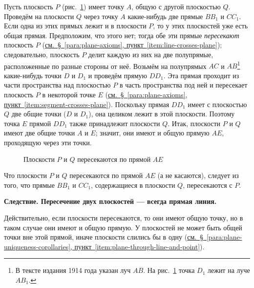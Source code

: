 Пусть плоскость \(P\) (рис.~\ref{fig:kiselev-stereo-303}) имеет точку \(A\), общую с другой плоскостью \(Q\). Проведём на плоскости \(Q\) через точку \(A\) какие-нибудь две прямые \(BB_1\) и \(CC_1\). Если одна из этих прямых лежит и в плоскости \(P\), то у этих плоскостей уже есть общая прямая. Предположим, что этого нет; тогда обе эти прямые \emph{пересекают} плоскость \(P\) (\hyperref[item:line-crosses-plane]{см.~§~\ref*{para:plane-axioms}, пункт~\ref*{item:line-crosses-plane}}); следовательно, плоскость \(P\) делит каждую из них на две полупрямые, расположенные по разные стороны от неё. Возьмём на полупрямых \(AC\) и \(AB\)\footnote{В тексте издания 1914 года указан луч \(AB\). На рис.~\ref{fig:kiselev-stereo-303} точка \(D_1\) лежит на луче \(AB_1\).} какие-нибудь точки \(D\) и \(D_1\) и проведём прямую \(DD_1\). Эта прямая проходит из части пространства над плоскостью \(P\) в часть пространства под ней и пересекает плоскость \(P\) в некоторой точке \(E\) (\hyperref[item:segment-crosses-plane]{см.~§~\ref*{para:plane-axioms}, пункт~\ref*{item:segment-crosses-plane}}). Поскольку прямая \(DD_1\) имеет с плоскостью \(Q\) две общие точки (\(D\) и \(D_1\)), она целиком лежит в этой плоскости. Поэтому точка \(E\) прямой \(DD_1\) также принадлежит плоскости \(Q\). Итак, плоскости \(P\) и \(Q\) имеют две общие точки \(A\) и \(E\); значит, они имеют и общую прямую \(AE\), проходящую через эти точки.

\begin{figure}[htbp]
    \centering
    \renewcommand{\thefigure}{303}
    \captionsetup{name=Рис.,labelsep=period}
    
    \caption{Плоскости \(P\) и \(Q\) пересекаются по прямой \(AE\)}\label{fig:kiselev-stereo-303}
\end{figure}

Что плоскости \(P\) и \(Q\) пересекаются по прямой \(AE\) (а не касаются), следует из того, что прямые \(BB_1\) и \(CC_1\), содержащиеся в плоскости \(Q\), пересекаются с \(P\).

 \textbf{Следствие. Пересечение двух плоскостей --- всегда прямая линия.}

Действительно, если плоскости пересекаются, то они имеют общую точку, но в таком случае они имеют и общую прямую.
У плоскостей не может быть общей точки вне этой прямой, иначе плоскости слились бы в одну (\hyperref[item:plane-through-line-and-point]{см.~§~\ref*{para:plane-uniqueness-corollaries}, пункт~\ref*{item:plane-through-line-and-point}}).
